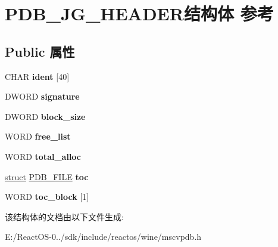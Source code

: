 \hypertarget{struct_p_d_b___j_g___h_e_a_d_e_r}{}\section{P\+D\+B\+\_\+\+J\+G\+\_\+\+H\+E\+A\+D\+E\+R结构体 参考}
\label{struct_p_d_b___j_g___h_e_a_d_e_r}
\subsection*{Public 属性}
\begin{DoxyCompactItemize}
\item 
\mbox{\label{struct_p_d_b___j_g___h_e_a_d_e_r_a6c13be578345caaf2b96a4b17305451f}} 
C\+H\+AR {\bfseries ident} \mbox{[}40\mbox{]}
\item 
\mbox{\label{struct_p_d_b___j_g___h_e_a_d_e_r_a5d5ec94957898bd8a55ef04bef33b128}} 
D\+W\+O\+RD {\bfseries signature}
\item 
\mbox{\label{struct_p_d_b___j_g___h_e_a_d_e_r_a5810eccef62f41a55aa6993fb8b0b4ba}} 
D\+W\+O\+RD {\bfseries block\+\_\+size}
\item 
\mbox{\label{struct_p_d_b___j_g___h_e_a_d_e_r_a3dcf8ba03b42db160166647c0eef4de7}} 
W\+O\+RD {\bfseries free\+\_\+list}
\item 
\mbox{\label{struct_p_d_b___j_g___h_e_a_d_e_r_a6af58fec2fcc04f9e9f9790df8879ef0}} 
W\+O\+RD {\bfseries total\+\_\+alloc}
\item 
\mbox{\label{struct_p_d_b___j_g___h_e_a_d_e_r_af18bea75bfdec71c417d89b16a6eeb31}} 
\hyperlink{interfacestruct}{struct} \hyperlink{struct_p_d_b___f_i_l_e}{P\+D\+B\+\_\+\+F\+I\+LE} {\bfseries toc}
\item 
\mbox{\label{struct_p_d_b___j_g___h_e_a_d_e_r_a0411b298d4f5cf1f826aaa78c380ef2c}} 
W\+O\+RD {\bfseries toc\+\_\+block} \mbox{[}1\mbox{]}
\end{DoxyCompactItemize}


该结构体的文档由以下文件生成\+:\begin{DoxyCompactItemize}
\item 
E\+:/\+React\+O\+S-\/0../sdk/include/reactos/wine/mscvpdb.\+h\end{DoxyCompactItemize}
